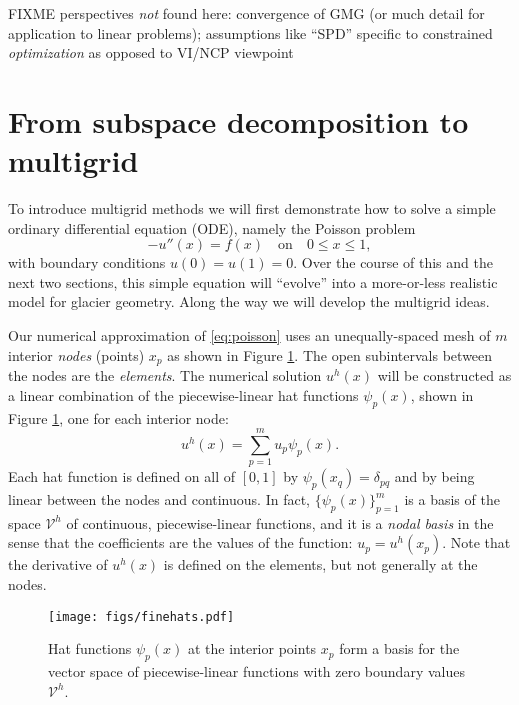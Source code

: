 \documentclass[letterpaper,final,12pt,reqno]{amsart}
\begin{document}
FIXME perspectives \emph{not} found here: convergence of GMG (or much detail for application to linear problems); assumptions like ``SPD'' specific to constrained \emph{optimization} as opposed to VI/NCP viewpoint


\section{From subspace decomposition to multigrid} \label{sec:subspace}

To introduce multigrid methods we will first demonstrate how to solve a simple ordinary differential equation (ODE), namely the Poisson problem
\begin{equation}
- u''(x) = f(x) \quad \text{on} \quad 0 \le x \le 1, \label{eq:poisson}
\end{equation}
with boundary conditions $u(0)=u(1)=0$.  Over the course of this and the next two sections, this simple equation will ``evolve'' into a more-or-less realistic model for glacier geometry.  Along the way we will develop the multigrid ideas.

Our numerical approximation of \eqref{eq:poisson} uses an unequally-spaced mesh of $m$ interior \emph{nodes} (points) $x_p$ as shown in Figure \ref{fig:finehats}.  The open subintervals between the nodes are the \emph{elements}.  The numerical solution $u^h(x)$ will be constructed as a linear combination of the piecewise-linear hat functions $\psi_p(x)$, shown in Figure \ref{fig:finehats}, one for each interior node:
\begin{equation}
u^h(x) = \sum_{p=1}^m u_p \psi_p(x). \label{eq:trialsolution}
\end{equation}
Each hat function is defined on all of $[0,1]$ by $\psi_p(x_q) = \delta_{pq}$ and by being linear between the nodes and continuous.  In fact, $\{\psi_p(x)\}_{p=1}^m$ is a basis of the space $\mathcal{V}^h$ of continuous, piecewise-linear functions, and it is a \emph{nodal basis} in the sense that the coefficients are the values of the function: $u_p=u^h(x_p)$.  Note that the derivative of $u^h(x)$ is defined on the elements, but not generally at the nodes.

\begin{figure}
\texttt{[image: figs/finehats.pdf]}
\caption{Hat functions $\psi_p(x)$ at the interior points $x_p$ form a basis for the vector space of piecewise-linear functions  with zero boundary values $\mathcal{V}^h$.}
\label{fig:finehats}
\end{figure}
\end{document}
